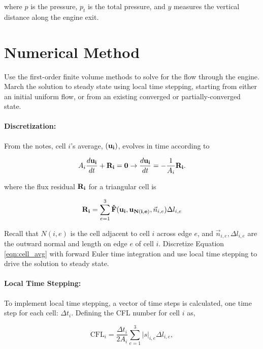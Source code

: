where $p$ is the pressure, $p_t$ is the total pressure, and $y$ measures the vertical distance along the engine exit.


\pagebreak
\section{Numerical Method}
Use the first-order finite volume methods to solve for the flow through the engine. March the solution to steady state using local time stepping, starting from either an initial uniform flow, or from an existing converged or partially-converged state.

\paragraph{Discretization:} From the notes, cell $i$'s average, $(\bf{u}_i)$, evolves in time according to

\begin{equation}\label{eqn:cell_avg}
    A_i\frac{d\bf{u}_i}{dt} + {\bf{R}_i = 0} \rightarrow \frac{d{\bf{u}_i}}{dt} = -\frac{1}{A_i}\bf{R}_i.
\end{equation}

where the flux residual $\bf{R}_i$ for a triangular cell is

\begin{equation}\label{eqn:flux_residual}
    {\bf{R}_i} = \sum_{e=1}^{3} {\bf{\hat{F}(u_i,u_{N({i,e})}}},\vec{n}_{i,e})\Delta l_{i,e}
\end{equation}

Recall that $N(i,e)$ is the cell adjacent to cell $i$ across edge $e$, and $\vec{n}_{i,e} , \Delta l_{i,e}$ are the outward normal and length on edge $e$ of cell $i$. Discretize Equation \ref{eqn:cell_avg} with forward Euler time integration and use local time stepping to drive the solution to steady state.

\paragraph{Local Time Stepping:} To implement local time stepping, a vector of time steps is calculated,
one time step for each cell: $\Delta t_i$. Defining the CFL number for cell $i$ as,

\begin{equation}\label{eqn:CFL}
    \text{CFL}_i = \frac{\Delta t_i}{2A_i}\sum_{e=1}^{3}|s|_{i,e}\Delta l_{i,e},
\end{equation}

